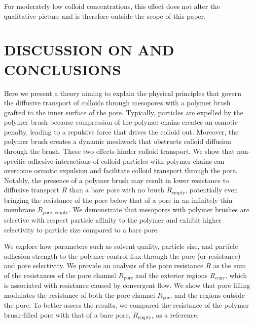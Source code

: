 \documentclass[12pt, a4paper]{article}
\begin{document}
For moderately low colloid concentrations, this effect does not alter the qualitative picture and is therefore outside the scope of this paper.

\section{DISCUSSION ON AND CONCLUSIONS}
Here we present a theory aiming to explain the physical principles that govern the diffusive transport of colloids through mesopores with a polymer brush grafted to the inner surface of the pore.
Typically, particles are expelled by the polymer brush because compression of the polymer chains creates an osmotic penalty, leading to a repulsive force that drives the colloid out.
Moreover, the polymer brush creates a dynamic meshwork that obstructs colloid diffusion through the brush.
These two effects hinder colloid transport.
We show that non-specific adhesive interactions of colloid particles with polymer chains can overcome osmotic expulsion and facilitate colloid transport through the pore.
Notably, the presence of a polymer brush may result in lower resistance to diffusive transport $R$ than a bare pore with no brush $R_{\text{empty}}$, potentially even bringing the resistance of the pore below that of a pore in an infinitely thin membrane $R_{\text{pore, empty}}$.
We demonstrate that mesopores with polymer brushes are selective with respect particle affinity to the polymer and exhibit higher selectivity to particle size compared to a bare pore.

We explore how parameters such as solvent quality, particle size, and particle adhesion strength to the polymer control flux through the pore (or resistance) and pore selectivity.
We provide an analysis of the pore resistance $R$ as the sum of the resistances of the pore channel $R_{\text{pore}}$ and the exterior regions $R_{\text{conv}}$, which is associated with resistance caused by convergent flow.
We show that pore filling modulates the resistance of both the pore channel $R_{\text{pore}}$ and the regions outside the pore.
To better assess the results, we compared the resistance of the polymer brush-filled pore with that of a bare pore, $R_{\text{empty}}$, as a reference. 
\end{document}

